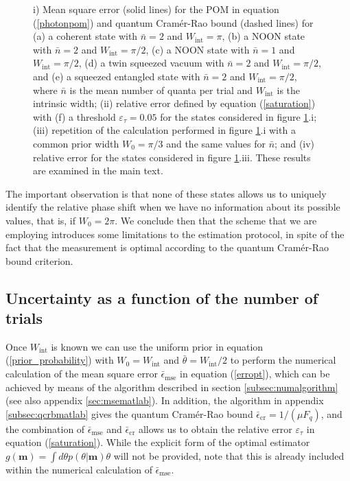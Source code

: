 \begin{figure}[t]
\caption[Non-asymptotic analysis of the Mach-Zehnder interferometer]{i) Mean square error (solid lines) for the POM in equation (\ref{photonpom}) and quantum Cram\'{e}r-Rao bound (dashed lines) for (a) a coherent state with $\bar{n} = 2$ and $W_{\mathrm{int}} = \pi$, (b) a NOON state with $\bar{n} = 2$ and $W_{\mathrm{int}} = \pi/2$, (c) a NOON state with $\bar{n} = 1$ and $W_{\mathrm{int}} = \pi/2$, (d) a twin squeezed vacuum with $\bar{n} = 2$ and $W_{\mathrm{int}} = \pi/2$, and (e) a squeezed entangled state with $\bar{n} = 2$ and $W_{\mathrm{int}} = \pi/2$, where $\bar{n}$ is the mean number of quanta per trial and $W_{\mathrm{int}}$ is the intrinsic width; (ii) relative error defined by equation (\ref{saturation}) with (f) a threshold $\varepsilon_\tau = 0.05$ for the states considered in figure \ref{mainresult}.i; (iii) repetition of the calculation performed in figure \ref{mainresult}.i with a common prior width $W_0 = \pi/3$ and the same values for $\bar{n}$; and (iv) relative error for the states considered in figure \ref{mainresult}.iii. These results are examined in the main text.}
\label{mainresult}
\end{figure}

The important observation is that none of these states allows us to uniquely identify the relative phase shift when we have no information about its possible values, that is, if $W_0= 2\pi$. We conclude then that the scheme that we are employing introduces some limitations to the estimation protocol, in spite of the fact that the measurement is optimal according to the quantum Cram\'{e}r-Rao bound criterion. 

\subsection{Uncertainty as a function of the number of trials}
\label{subsec:uncertaintynonasymptotic}

Once $W_{\mathrm{int}}$ is known we can use the uniform prior in equation (\ref{prior_probability}) with $W_0 = W_{\mathrm{int}}$ and $\bar{\theta} = W_{\mathrm{int}}/2$ to perform the numerical calculation of the mean square error $\bar{\epsilon}_{\mathrm{mse}}$ in equation (\ref{erropt}), which can be achieved by means of the algorithm described in section \ref{subsec:numalgorithm} (see also appendix \ref{sec:msematlab}). In addition, the algorithm in appendix \ref{subsec:qcrbmatlab} gives the quantum Cram\'{e}r-Rao bound $\bar{\epsilon}_{\mathrm{cr}} = 1/(\mu F_q)$, and the combination of $\bar{\epsilon}_{\mathrm{mse}}$ and $\bar{\epsilon}_{\mathrm{cr}}$ allows us to obtain the relative error $\varepsilon_{\tau}$ in equation (\ref{saturation}). While the explicit form of the optimal estimator $g(\boldsymbol{m}) = \int d\theta p(\theta|\boldsymbol{m})\theta$ will not be provided, note that this is already included within the numerical calculation of $\bar{\epsilon}_{\mathrm{mse}}$.

